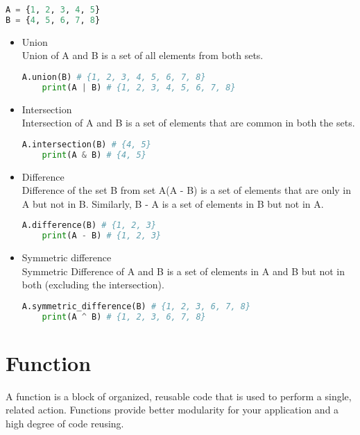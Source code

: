 \documentclass[a4paper, 12pt, titlepage]{scrartcl} %
\begin{document}
\begin{lstlisting}[language=Python]
A = {1, 2, 3, 4, 5}
B = {4, 5, 6, 7, 8}
\end{lstlisting} \vspace{5mm}
\begin{itemize}
    \item Union \\
    Union of A and B is a set of all elements from both sets.
    \begin{lstlisting}[language=Python]
    A.union(B) # {1, 2, 3, 4, 5, 6, 7, 8}
    print(A | B) # {1, 2, 3, 4, 5, 6, 7, 8}\end{lstlisting} \vspace{5mm}
    
    \item Intersection \\
    Intersection of A and B is a set of elements that are common in both the sets.
    \begin{lstlisting}[language=Python]
    A.intersection(B) # {4, 5}
    print(A & B) # {4, 5}\end{lstlisting} \vspace{5mm}
    
    \item Difference \\
    Difference of the set B from set A(A - B) is a set of elements that are only in A but not in B. Similarly, B - A is a set of elements in B but not in A.
    \begin{lstlisting}[language=Python]
    A.difference(B) # {1, 2, 3}
    print(A - B) # {1, 2, 3}\end{lstlisting} \vspace{5mm}
    
    \item Symmetric difference \\
    Symmetric Difference of A and B is a set of elements in A and B but not in both (excluding the intersection).
    \begin{lstlisting}[language=Python]
    A.symmetric_difference(B) # {1, 2, 3, 6, 7, 8}
    print(A ^ B) # {1, 2, 3, 6, 7, 8}\end{lstlisting} \vspace{5mm}
    
\end{itemize}

\newpage
\section{Function}
\label{sec:Function}
A function is a block of organized, reusable code that is used to perform a single, related action. Functions provide better modularity for your application and a high degree of code reusing.
\end{document}
